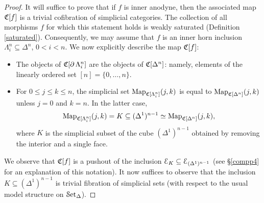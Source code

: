 \begin{proof}
It will suffice to prove that if $f$ is inner anodyne, then the associated map
$\operatorname{\mathfrak{C}}[f]$ is a trivial cofibration of simplicial categories. The collection of all
morphisms $f$ for which this statement holds is weakly saturated (Definition \ref{saturated}). Consequently, we may assume that $f$ is an inner horn inclusion $\Lambda^n_i \subseteq \Delta^n$, $0 < i < n$.
We now explicitly describe the map $\operatorname{\mathfrak{C}}[f]$:

\begin{itemize}
\item The objects of $\operatorname{\mathfrak{C}}[\operatorname{\partial} \Lambda^n_i]$ are the objects of
$\operatorname{\mathfrak{C}}[\Delta^n]$: namely, elements of the linearly ordered
set $[n] = \{0, \ldots, n\}$. 

\item For $0 \leq j \leq k \leq n$, the simplicial set
$\operatorname{{Map}}_{\operatorname{\mathfrak{C}}[\Lambda^n_i]}(j,k)$ is equal to
$\operatorname{{Map}}_{\operatorname{\mathfrak{C}}[\Delta^n]}(j,k)$ unless $j=0$ and $k=n$. In the
latter case, $$\operatorname{{Map}}_{\operatorname{\mathfrak{C}}[\Lambda^n_i]}(j,k) = K \subseteq
(\Delta^1)^{n-1} \simeq \operatorname{{Map}}_{\operatorname{\mathfrak{C}}[\Delta^n]}(j,k),$$
where $K$ is the simplicial subset of the cube $(\Delta^1)^{n-1}$ obtained
by removing the interior and a single face.
\end{itemize}

We observe that $\operatorname{\mathfrak{C}}[f]$ is a pushout of the inclusion $\operatorname{\mathcal{E}}_{K} \subseteq
\operatorname{\mathcal{E}}_{ (\Delta^1)^{n-1} }$ (see \S \ref{compp4} for an explanation of this notation).
It now suffices to observe that the inclusion $K \subseteq (\Delta^1)^{n-1}$ is trivial fibration of simplicial sets (with respect to the usual model structure on $\operatorname{\mathcal{S}et_{\Delta}}$).
\end{proof}

